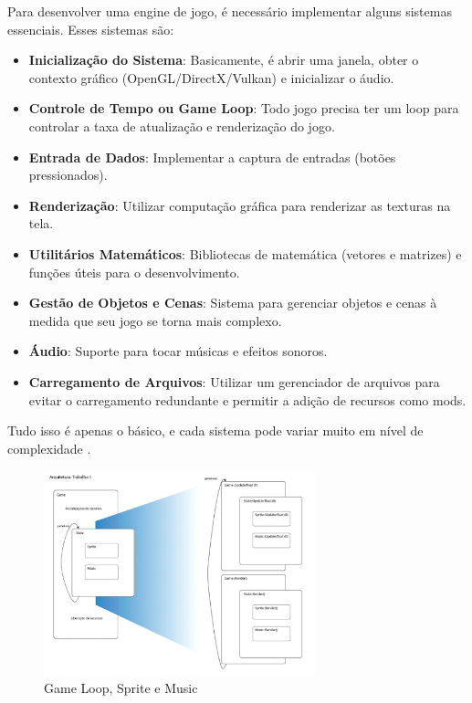 Para desenvolver uma engine de jogo, é necessário implementar alguns sistemas essenciais. Esses sistemas são:

\begin{itemize}
  \item \textbf{Inicialização do Sistema}: Basicamente, é abrir uma janela, obter o contexto gráfico (OpenGL/DirectX/Vulkan) e inicializar o áudio.
  \item \textbf{Controle de Tempo ou Game Loop}: Todo jogo precisa ter um loop para controlar a taxa de atualização e renderização do jogo.
  \item \textbf{Entrada de Dados}: Implementar a captura de entradas (botões pressionados).
  \item \textbf{Renderização}: Utilizar computação gráfica para renderizar as texturas na tela.
  \item \textbf{Utilitários Matemáticos}: Bibliotecas de matemática (vetores e matrizes) e funções úteis para o desenvolvimento.
  \item \textbf{Gestão de Objetos e Cenas}: Sistema para gerenciar objetos e cenas à medida que seu jogo se torna mais complexo.
  \item \textbf{Áudio}: Suporte para tocar músicas e efeitos sonoros.
  \item \textbf{Carregamento de Arquivos}: Utilizar um gerenciador de arquivos para evitar o carregamento redundante e permitir a adição de recursos como mods.
\end{itemize}

Tudo isso é apenas o básico, e cada sistema pode variar muito em nível de complexidade .

\begin{figure}[htbp]
    \centering
    \caption{Game Loop, Sprite e Music}
    \label{fig:GSM}
    \includegraphics[width=0.7\textwidth]{figuras/cic-engine.png}
\end{figure}

